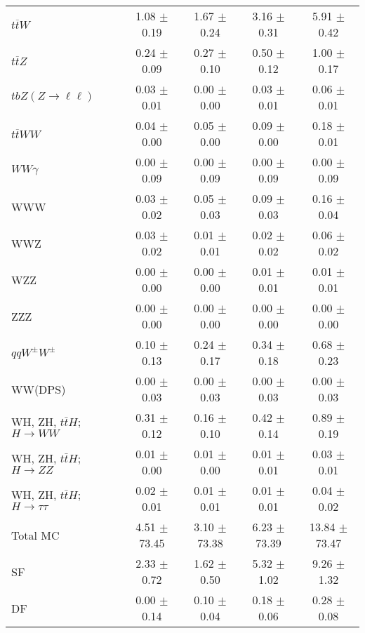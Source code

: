 \begin{tabular}{l|cccc}
                   $t\overline{t}W$ &  1.08 $\pm$  0.19 &  1.67 $\pm$  0.24 &  3.16 $\pm$  0.31 &  5.91 $\pm$  0.42 \\
                   $t\overline{t}Z$ &  0.24 $\pm$  0.09 &  0.27 $\pm$  0.10 &  0.50 $\pm$  0.12 &  1.00 $\pm$  0.17 \\
    $tbZ (Z \rightarrow \ell \ell)$ &  0.03 $\pm$  0.01 &  0.00 $\pm$  0.00 &  0.03 $\pm$  0.01 &  0.06 $\pm$  0.01 \\
                  $t\overline{t}WW$ &  0.04 $\pm$  0.00 &  0.05 $\pm$  0.00 &  0.09 $\pm$  0.00 &  0.18 $\pm$  0.01 \\
                         $WW\gamma$ &  0.00 $\pm$  0.09 &  0.00 $\pm$  0.09 &  0.00 $\pm$  0.09 &  0.00 $\pm$  0.09 \\
                                WWW &  0.03 $\pm$  0.02 &  0.05 $\pm$  0.03 &  0.09 $\pm$  0.03 &  0.16 $\pm$  0.04 \\
                                WWZ &  0.03 $\pm$  0.02 &  0.01 $\pm$  0.01 &  0.02 $\pm$  0.02 &  0.06 $\pm$  0.02 \\
                                WZZ &  0.00 $\pm$  0.00 &  0.00 $\pm$  0.00 &  0.01 $\pm$  0.01 &  0.01 $\pm$  0.01 \\
                                ZZZ &  0.00 $\pm$  0.00 &  0.00 $\pm$  0.00 &  0.00 $\pm$  0.00 &  0.00 $\pm$  0.00 \\
                 $qqW^{\pm}W^{\pm}$ &  0.10 $\pm$  0.13 &  0.24 $\pm$  0.17 &  0.34 $\pm$  0.18 &  0.68 $\pm$  0.23 \\
                            WW(DPS) &  0.00 $\pm$  0.03 &  0.00 $\pm$  0.03 &  0.00 $\pm$  0.03 &  0.00 $\pm$  0.03 \\
WH, ZH, $t\bar{t}H$; $H \rightarrow WW$ &  0.31 $\pm$  0.12 &  0.16 $\pm$  0.10 &  0.42 $\pm$  0.14 &  0.89 $\pm$  0.19 \\
WH, ZH, $t\bar{t}H$; $H \rightarrow ZZ$ &  0.01 $\pm$  0.00 &  0.01 $\pm$  0.00 &  0.01 $\pm$  0.01 &  0.03 $\pm$  0.01 \\
WH, ZH, $t\bar{t}H$; $H \rightarrow \tau\tau$ &  0.02 $\pm$  0.01 &  0.01 $\pm$  0.01 &  0.01 $\pm$  0.01 &  0.04 $\pm$  0.02 \\
\hline\hline
                           Total MC &  4.51 $\pm$ 73.45 &  3.10 $\pm$ 73.38 &  6.23 $\pm$ 73.39 & 13.84 $\pm$ 73.47 \\
\hline
                                 SF &  2.33 $\pm$  0.72 &  1.62 $\pm$  0.50 &  5.32 $\pm$  1.02 &  9.26 $\pm$  1.32 \\
                                 DF &  0.00 $\pm$  0.14 &  0.10 $\pm$  0.04 &  0.18 $\pm$  0.06 &  0.28 $\pm$  0.08 \\

\end{tabular}
